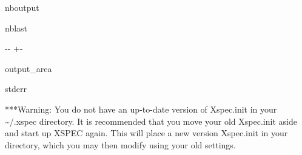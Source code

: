 \documentclass[letterpaper,10pt,english]{sphinxmanual}
\newlength\nbsphinxcodecellspacing
\begin{document}
\begin{sphinxuseclass}{nboutput}
\begin{sphinxuseclass}{nblast}
{

\kern-\sphinxverbatimsmallskipamount\kern-\baselineskip
\kern+\FrameHeightAdjust\kern-\fboxrule
\vspace{\nbsphinxcodecellspacing}

\begin{sphinxuseclass}{output_area}
\begin{sphinxuseclass}{stderr}


\begin{sphinxVerbatim}[commandchars=\\\{\}]
***Warning: You do not have an up-to-date version of Xspec.init
      in your \textasciitilde{}/.xspec directory.  It is recommended that you move
      your old Xspec.init aside and start up XSPEC again.  This will
      place a new version Xspec.init in your directory, which you may
      then modify using your old settings.
\end{sphinxVerbatim}



\end{sphinxuseclass}
\end{sphinxuseclass}
}

\end{sphinxuseclass}
\end{sphinxuseclass}
\end{document}
